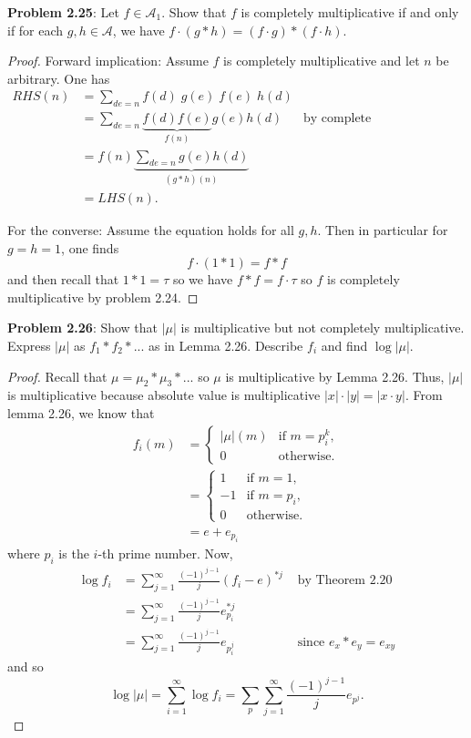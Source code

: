 \documentclass{article}
\newcommand{\A}{\mathcal{A}}
\begin{document}
\textbf{Problem 2.25}: Let $f \in \A_1$. Show that $f$ is completely multiplicative if and only if for each $g, h \in \A$, we have $f \cdot (g * h) = (f \cdot g) * (f \cdot h)$.

\begin{proof}
Forward implication: Assume $f$ is completely multiplicative and let $n$ be arbitrary. One has
\begin{align*}
RHS(n) &= \sum_{de = n} f(d) \; g(e) \; f(e) \; h(d)\\
&= \sum_{de = n} \underbrace{f(d) f(e)}_{f(n)} g(e) h(d) &\text{by complete multiplicativity}\\
&= f(n) \underbrace{\sum_{de = n} g(e) h(d)}_{(g * h)(n)}\\
&= LHS(n).
\end{align*}

For the converse: Assume the equation holds for all $g, h$. Then in particular for $g = h = 1$, one finds
$$f \cdot (1 * 1) = f * f$$
and then recall that $1 * 1 = \tau$ so we have $f * f = f \cdot \tau$ so $f$ is completely multiplicative by problem 2.24.
\end{proof}

\textbf{Problem 2.26}: Show that $|\mu|$ is multiplicative but not completely multiplicative. Express $|\mu|$ as $f_1 * f_2 * ...$ as in Lemma 2.26. Describe $f_i$ and find $\log |\mu|$.

\begin{proof}
Recall that $\mu = \mu_2 * \mu_3 * ...$ so $\mu$ is multiplicative by Lemma 2.26. Thus, $|\mu|$ is multiplicative because absolute value is multiplicative $|x| \cdot |y| = |x \cdot y|$. From lemma 2.26, we know that
\begin{align*}
f_i(m) &= \begin{cases}
|\mu|(m) &\text{if } m = p_i^k,\\
0 &\text{otherwise}.
\end{cases}\\
&= \begin{cases}
1 &\text{if } m = 1,\\
-1 &\text{if } m = p_i,\\
0 &\text{otherwise}.
\end{cases}\\
&= e + e_{p_i}
\end{align*}
where $p_i$ is the $i$-th prime number. Now,
\begin{align*}
\log f_i &= \sum_{j=1}^{\infty} \frac{(-1)^{j-1}}{j} (f_i - e)^{*j} &\text{ by Theorem 2.20}\\
&= \sum_{j=1}^{\infty} \frac{(-1)^{j-1}}{j} e_{p_i}^{*j}\\
&= \sum_{j=1}^{\infty} \frac{(-1)^{j-1}}{j} e_{p_i^j} &\text{ since } e_x * e_y = e_{xy}
\end{align*}
and so
$$\log |\mu| = \sum_{i=1}^{\infty} \log f_i = \sum_p \sum_{j=1}^{\infty} \frac{(-1)^{j-1}}{j} e_{p^j}.$$
\end{proof}
\end{document}
